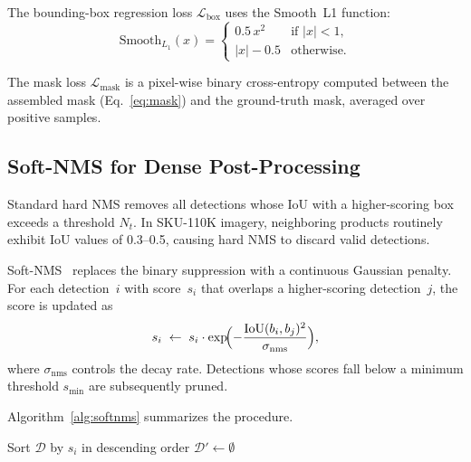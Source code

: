 \documentclass[conference]{IEEEtran}
\begin{document}
The bounding-box regression loss $\mathcal{L}_{\text{box}}$ uses the
Smooth~L1 function:
\begin{equation}
  \text{Smooth}_{L_1}(x) =
  \begin{cases}
    0.5\,x^{2}        & \text{if } |x| < 1, \\
    |x| - 0.5         & \text{otherwise}.
  \end{cases}
  \label{eq:smoothl1}
\end{equation}

The mask loss $\mathcal{L}_{\text{mask}}$ is a pixel-wise binary
cross-entropy computed between the assembled mask
(Eq.~\ref{eq:mask}) and the ground-truth mask, averaged over positive
samples.

\subsection{Soft-NMS for Dense Post-Processing}
\label{sec:softnms}

Standard hard NMS removes all detections whose IoU with a higher-scoring
box exceeds a threshold $N_t$. In SKU-110K imagery, neighboring products
routinely exhibit IoU values of 0.3--0.5, causing hard NMS to discard
valid detections.

Soft-NMS~\cite{bodla2017soft} replaces the binary suppression with a
continuous Gaussian penalty. For each detection~$i$ with score~$s_i$
that overlaps a higher-scoring detection~$j$, the score is updated as
\begin{equation}
  s_i \;\leftarrow\; s_i \cdot \exp\!\Bigl(-\frac{\text{IoU}(b_i, b_j)^{2}}{\sigma_{\text{nms}}}\Bigr),
  \label{eq:softnms}
\end{equation}
where $\sigma_{\text{nms}}$ controls the decay rate. Detections whose
scores fall below a minimum threshold $s_{\min}$ are subsequently pruned.

Algorithm~\ref{alg:softnms} summarizes the procedure.

\begin{algorithm}[t]
  \caption{Gaussian Soft-NMS}
  \label{alg:softnms}
  Sort $\mathcal{D}$ by $s_i$ in descending order\;
  $\mathcal{D}' \leftarrow \emptyset$\;
\end{algorithm}
\end{document}
